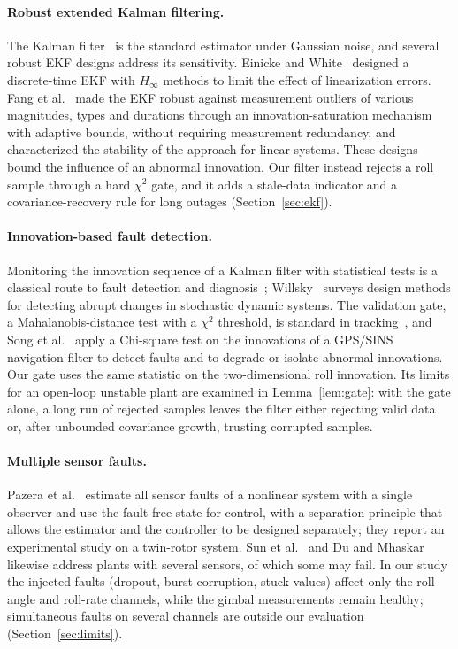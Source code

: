 \documentclass[preprint,12pt,authoryear=false]{elsarticle}
\theoremstyle{remark}\newtheorem{remark}{Remark}
\theoremstyle{plain}\newtheorem{proposition}{Proposition}\newtheorem{lemma}{Lemma}
\theoremstyle{definition}\newtheorem{assumption}{Assumption}
\begin{document}
\paragraph{Robust extended Kalman filtering.}
The Kalman filter~\cite{kalman1960new} is the standard estimator under Gaussian noise, and several robust EKF designs address its sensitivity. Einicke and White~\cite{einicke1999robust} designed a discrete-time EKF with $H_\infty$ methods to limit the effect of linearization errors. Fang et al.~\cite{fang2022robust} made the EKF robust against measurement outliers of various magnitudes, types and durations through an innovation-saturation mechanism with adaptive bounds, without requiring measurement redundancy, and characterized the stability of the approach for linear systems. These designs bound the influence of an abnormal innovation. Our filter instead rejects a roll sample through a hard $\chi^2$ gate, and it adds a stale-data indicator and a covariance-recovery rule for long outages (Section~\ref{sec:ekf}).

\paragraph{Innovation-based fault detection.}
Monitoring the innovation sequence of a Kalman filter with statistical tests is a classical route to fault detection and diagnosis~\cite{mehra1971innovations}; Willsky~\cite{willsky1976survey} surveys design methods for detecting abrupt changes in stochastic dynamic systems. The validation gate, a Mahalanobis-distance test with a $\chi^2$ threshold, is standard in tracking~\cite{barshalom2001estimation}, and Song et al.~\cite{song2024innovation} apply a Chi-square test on the innovations of a GPS/SINS navigation filter to detect faults and to degrade or isolate abnormal innovations. Our gate uses the same statistic on the two-dimensional roll innovation. Its limits for an open-loop unstable plant are examined in Lemma~\ref{lem:gate}: with the gate alone, a long run of rejected samples leaves the filter either rejecting valid data or, after unbounded covariance growth, trusting corrupted samples.

\paragraph{Multiple sensor faults.}
Pazera et al.~\cite{pazera2018robust} estimate all sensor faults of a nonlinear system with a single observer and use the fault-free state for control, with a separation principle that allows the estimator and the controller to be designed separately; they report an experimental study on a twin-rotor system. Sun et al.~\cite{sun2025adaptive} and Du and Mhaskar~\cite{du2014isolation} likewise address plants with several sensors, of which some may fail. In our study the injected faults (dropout, burst corruption, stuck values) affect only the roll-angle and roll-rate channels, while the gimbal measurements remain healthy; simultaneous faults on several channels are outside our evaluation (Section~\ref{sec:limits}).
\end{document}
